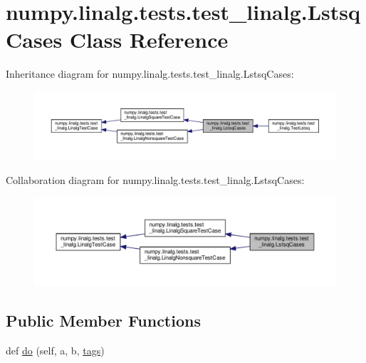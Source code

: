 \hypertarget{classnumpy_1_1linalg_1_1tests_1_1test__linalg_1_1LstsqCases}{}\section{numpy.\+linalg.\+tests.\+test\+\_\+linalg.\+Lstsq\+Cases Class Reference}
\label{classnumpy_1_1linalg_1_1tests_1_1test__linalg_1_1LstsqCases}


Inheritance diagram for numpy.\+linalg.\+tests.\+test\+\_\+linalg.\+Lstsq\+Cases\+:
\nopagebreak
\begin{figure}[H]
\begin{center}
\leavevmode
\includegraphics[width=350pt]{classnumpy_1_1linalg_1_1tests_1_1test__linalg_1_1LstsqCases__inherit__graph}
\end{center}
\end{figure}


Collaboration diagram for numpy.\+linalg.\+tests.\+test\+\_\+linalg.\+Lstsq\+Cases\+:
\nopagebreak
\begin{figure}[H]
\begin{center}
\leavevmode
\includegraphics[width=350pt]{classnumpy_1_1linalg_1_1tests_1_1test__linalg_1_1LstsqCases__coll__graph}
\end{center}
\end{figure}
\subsection*{Public Member Functions}
\begin{DoxyCompactItemize}
\item 
def \hyperlink{classnumpy_1_1linalg_1_1tests_1_1test__linalg_1_1LstsqCases_afb7447b71d3b4689fe627975153c3065}{do} (self, a, b, \hyperlink{namespacenumpy_1_1linalg_1_1tests_1_1test__linalg_ac6a064918e74d701a7b5aac0ffefe1e7}{tags})
\end{DoxyCompactItemize}
